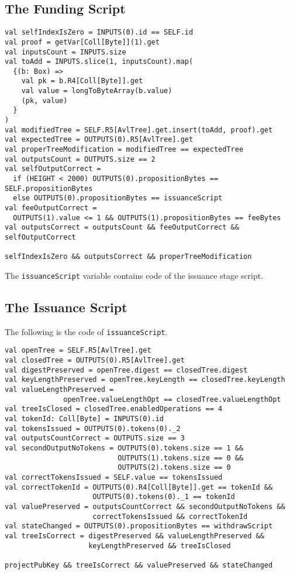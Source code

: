 \documentclass[runningheads]{llncs}
\begin{document}
\subsection{The Funding Script}
\label{ico-funding}


\small{\begin{verbatim}
val selfIndexIsZero = INPUTS(0).id == SELF.id
val proof = getVar[Coll[Byte]](1).get
val inputsCount = INPUTS.size
val toAdd = INPUTS.slice(1, inputsCount).map(
  {(b: Box) =>
    val pk = b.R4[Coll[Byte]].get
    val value = longToByteArray(b.value)
    (pk, value)
  }
)
val modifiedTree = SELF.R5[AvlTree].get.insert(toAdd, proof).get
val expectedTree = OUTPUTS(0).R5[AvlTree].get
val properTreeModification = modifiedTree == expectedTree
val outputsCount = OUTPUTS.size == 2
val selfOutputCorrect = 
  if (HEIGHT < 2000) OUTPUTS(0).propositionBytes == SELF.propositionBytes
  else OUTPUTS(0).propositionBytes == issuanceScript 
val feeOutputCorrect = 
  OUTPUTS(1).value <= 1 && OUTPUTS(1).propositionBytes == feeBytes
val outputsCorrect = outputsCount && feeOutputCorrect && selfOutputCorrect

selfIndexIsZero && outputsCorrect && properTreeModification
\end{verbatim}
}

The \texttt{issuanceScript} variable contains code of the issuance stage script.

\subsection{The Issuance Script}
\label{ico-issuance}
The following is the code of \texttt{issuanceScript}.
\small{
\begin{verbatim}
val openTree = SELF.R5[AvlTree].get
val closedTree = OUTPUTS(0).R5[AvlTree].get
val digestPreserved = openTree.digest == closedTree.digest
val keyLengthPreserved = openTree.keyLength == closedTree.keyLength
val valueLengthPreserved = 
              openTree.valueLengthOpt == closedTree.valueLengthOpt
val treeIsClosed = closedTree.enabledOperations == 4
val tokenId: Coll[Byte] = INPUTS(0).id
val tokensIssued = OUTPUTS(0).tokens(0)._2
val outputsCountCorrect = OUTPUTS.size == 3
val secondOutputNoTokens = OUTPUTS(0).tokens.size == 1 && 
                           OUTPUTS(1).tokens.size == 0 && 
                           OUTPUTS(2).tokens.size == 0
val correctTokensIssued = SELF.value == tokensIssued
val correctTokenId = OUTPUTS(0).R4[Coll[Byte]].get == tokenId &&
                     OUTPUTS(0).tokens(0)._1 == tokenId
val valuePreserved = outputsCountCorrect && secondOutputNoTokens && 
                     correctTokensIssued && correctTokenId
val stateChanged = OUTPUTS(0).propositionBytes == withdrawScript
val treeIsCorrect = digestPreserved && valueLengthPreserved && 
                    keyLengthPreserved && treeIsClosed

projectPubKey && treeIsCorrect && valuePreserved && stateChanged
\end{verbatim}
}
\end{document}
